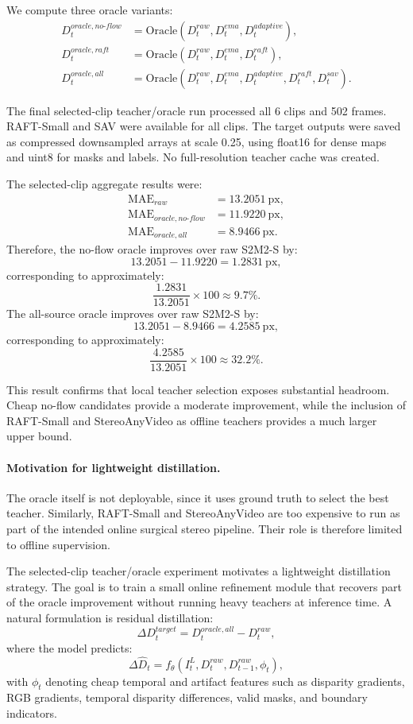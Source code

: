 \documentclass[11pt,a4paper]{article}
\begin{document}
We compute three oracle variants:
\[
\begin{aligned}
D_t^{oracle,no\text{-}flow}
&=
\mathrm{Oracle}
\left(
D_t^{raw}, D_t^{ema}, D_t^{adaptive}
\right), \\
D_t^{oracle,raft}
&=
\mathrm{Oracle}
\left(
D_t^{raw}, D_t^{ema}, D_t^{raft}
\right), \\
D_t^{oracle,all}
&=
\mathrm{Oracle}
\left(
D_t^{raw}, D_t^{ema}, D_t^{adaptive}, D_t^{raft}, D_t^{sav}
\right).
\end{aligned}
\]

The final selected-clip teacher/oracle run processed all 6 clips and 502 frames.
RAFT-Small and SAV were available for all clips. The target outputs were saved as
compressed downsampled arrays at scale 0.25, using float16 for dense maps and
uint8 for masks and labels. No full-resolution teacher cache was created.

The selected-clip aggregate results were:
\[
\begin{aligned}
\mathrm{MAE}_{raw} &= 13.2051~\mathrm{px}, \\
\mathrm{MAE}_{oracle,no\text{-}flow} &= 11.9220~\mathrm{px}, \\
\mathrm{MAE}_{oracle,all} &= 8.9466~\mathrm{px}.
\end{aligned}
\]
Therefore, the no-flow oracle improves over raw S2M2-S by:
\[
13.2051 - 11.9220 = 1.2831~\mathrm{px},
\]
corresponding to approximately:
\[
\frac{1.2831}{13.2051} \times 100 \approx 9.7\%.
\]
The all-source oracle improves over raw S2M2-S by:
\[
13.2051 - 8.9466 = 4.2585~\mathrm{px},
\]
corresponding to approximately:
\[
\frac{4.2585}{13.2051} \times 100 \approx 32.2\%.
\]

This result confirms that local teacher selection exposes substantial headroom.
Cheap no-flow candidates provide a moderate improvement, while the inclusion of
RAFT-Small and StereoAnyVideo as offline teachers provides a much larger upper
bound.

\paragraph{Motivation for lightweight distillation.}
The oracle itself is not deployable, since it uses ground truth to select the
best teacher. Similarly, RAFT-Small and StereoAnyVideo are too expensive to run
as part of the intended online surgical stereo pipeline. Their role is therefore
limited to offline supervision.

The selected-clip teacher/oracle experiment motivates a lightweight distillation
strategy. The goal is to train a small online refinement module that recovers
part of the oracle improvement without running heavy teachers at inference time.
A natural formulation is residual distillation:
\[
\Delta D_t^{target}
=
D_t^{oracle,all} - D_t^{raw},
\]
where the model predicts:
\[
\Delta \hat{D}_t
=
f_{\theta}
\left(
I_t^L,
D_t^{raw},
D_{t-1}^{raw},
\phi_t
\right),
\]
with \(\phi_t\) denoting cheap temporal and artifact features such as disparity
gradients, RGB gradients, temporal disparity differences, valid masks, and
boundary indicators.
\end{document}
